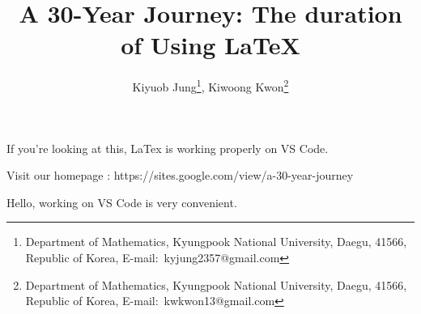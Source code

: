 \documentclass[a4paper,11pt]{article}
\title{
    A 30-Year Journey: The duration of Using LaTeX
    }
\author{
    Kiyuob Jung\thanks{Department of Mathematics, Kyungpook National University, Daegu, 41566, Republic of Korea, E-mail:~kyjung2357@gmail.com},
    Kiwoong Kwon\thanks{Department of Mathematics, Kyungpook National University, Daegu, 41566, Republic of Korea, E-mail:~kwkwon13@gmail.com}
    }
\begin{document}
\date{}
\maketitle

If you're looking at this, LaTex is working properly on VS Code.

Visit our homepage : https://sites.google.com/view/a-30-year-journey

Hello, working on VS Code is very convenient.
\end{document}
